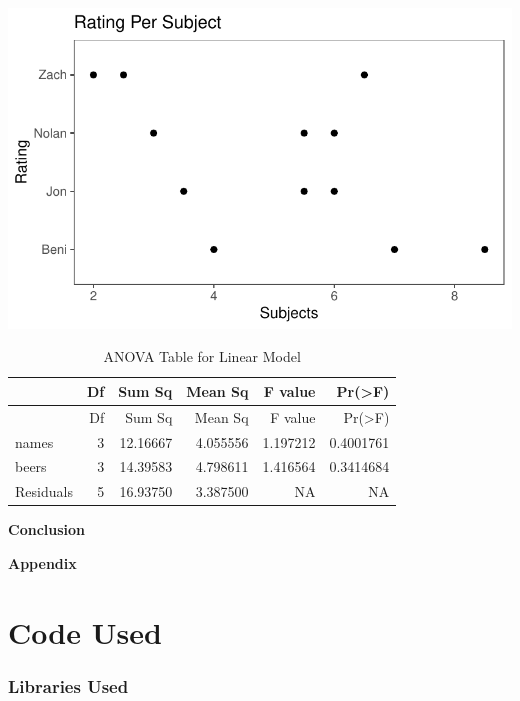 \documentclass[
  12,
  letterpaper,
  DIV=11,
  numbers=noendperiod]{scrartcl}
\begin{document}
\includegraphics{BIBD_beer_preferences_files/figure-pdf/unnamed-chunk-4-1.pdf}

\begin{longtable}[]{@{}lrrrrr@{}}
\caption{ANOVA Table for Linear Model}\tabularnewline
\toprule\noalign{}
& Df & Sum Sq & Mean Sq & F value & Pr(\textgreater F) \\
\midrule\noalign{}
\endfirsthead
\toprule\noalign{}
& Df & Sum Sq & Mean Sq & F value & Pr(\textgreater F) \\
\midrule\noalign{}
\endhead
\bottomrule\noalign{}
\endlastfoot
names & 3 & 12.16667 & 4.055556 & 1.197212 & 0.4001761 \\
beers & 3 & 14.39583 & 4.798611 & 1.416564 & 0.3414684 \\
Residuals & 5 & 16.93750 & 3.387500 & NA & NA \\
\end{longtable}

\newpage

\begin{center}
\textbf{\Large Conclusion}
\end{center}

\newpage

\begin{center}
\textbf{\Large Appendix}
\end{center}

\hypertarget{code-used}{%
\section{Code Used}\label{code-used}}

\hypertarget{libraries-used}{%
\subsubsection{Libraries Used}\label{libraries-used}}
\end{document}
